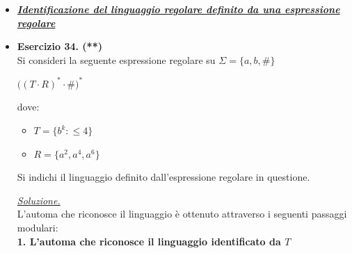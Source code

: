 \documentclass[a4paper,10pt]{article}
\begin{document}
{\begin{itemize}[label=, leftmargin=0pt]
        \begin{osservazioni}
        \underline{\textit{Soluzione.}}\\
        L'automa riconosce il linguaggio identificato da $$1^*0\bigg(0^*+(1^+0)^*\bigg)^*$$
    \end{osservazioni}
$\\$

    \item \underline{\textit{\textbf{Identificazione del linguaggio regolare definito da una espressione regolare}}}

    \item \textbf{Esercizio 34. (**)}\\ Si consideri la seguente espressione regolare su $\Sigma=\{a,b,\#\}$
    {\begin{center}
        $\bigg((T\cdot R)^* \cdot \#\bigg)^*$
    \end{center}} 
    dove:
    \begin{itemize}[label=]
        \item $T=\{b^k:\leq 4\}$
        \item $R =\{a^2, a^4, a^6\}$
    \end{itemize}
    Si indichi il linguaggio definito dall'espressione regolare in questione.\\
        \begin{osservazioni}
        \underline{\textit{Soluzione.}}\\
    L'automa che riconosce il linguaggio è ottenuto attraverso i seguenti passaggi modulari:\\

    \textbf{1. L'automa che riconosce il linguaggio identificato da $T$}
        {
    \small
    \begin{center}
    \end{center}
    }


\end{osservazioni}
\end{itemize}}
\end{document}
